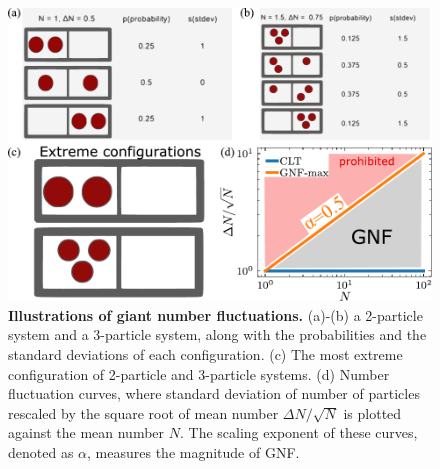  \begin{figure}[h]
 	\begin{center}
 	\includegraphics[width=5 in]{Figs/1-Intro/GNF/GNF-illustration.pdf}
 	\end{center}
 	\caption[Illustrations of giant number fluctuations]
 	{
	\textbf{Illustrations of giant number fluctuations.}
	(a)-(b) a 2-particle system and a 3-particle system, along with the probabilities and the standard deviations of each configuration.
	(c) The most extreme configuration of 2-particle and 3-particle systems.
	(d) Number fluctuation curves, where standard deviation of number of particles rescaled by the square root of mean number $\Delta N/\sqrt N$ is plotted against the mean number $N$. The scaling exponent of these curves, denoted as $\alpha$, measures the magnitude of GNF.
 	}
 	\label{fig:GNF-illustration}
 \end{figure}

